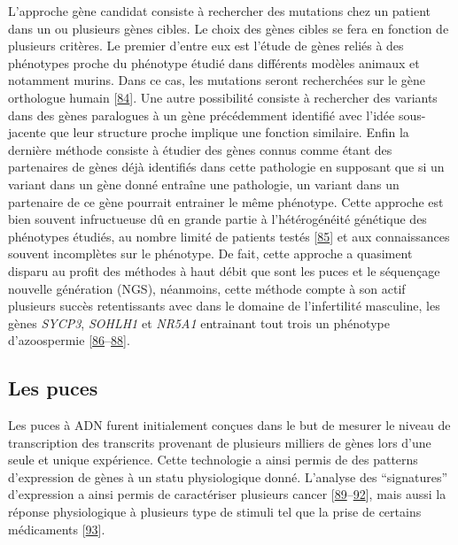 \documentclass[12pt,twoside]{reedthesis}
\theoremstyle{definition}
\theoremstyle{definition}
\theoremstyle{remark}
\begin{document}
  L'approche gène candidat consiste à rechercher des mutations chez un
  patient dans un ou plusieurs gènes cibles. Le choix des gènes cibles se
  fera en fonction de plusieurs critères. Le premier d'entre eux est
  l'étude de gènes reliés à des phénotypes proche du phénotype étudié dans
  différents modèles animaux et notamment murins. Dans ce cas, les
  mutations seront recherchées sur le gène orthologue humain
  {[}\protect\hyperlink{ref-DeBoer2015}{84}{]}. Une autre possibilité
  consiste à rechercher des variants dans des gènes paralogues à un gène
  précédemment identifié avec l'idée sous-jacente que leur structure
  proche implique une fonction similaire. Enfin la dernière méthode
  consiste à étudier des gènes connus comme étant des partenaires de gènes
  déjà identifiés dans cette pathologie en supposant que si un variant
  dans un gène donné entraîne une pathologie, un variant dans un
  partenaire de ce gène pourrait entrainer le même phénotype. Cette
  approche est bien souvent infructueuse dû en grande partie à
  l'hétérogénéité génétique des phénotypes étudiés, au nombre limité de
  patients testés {[}\protect\hyperlink{ref-ElInati2012}{85}{]} et aux
  connaissances souvent incomplètes sur le phénotype. De fait, cette
  approche a quasiment disparu au profit des méthodes à haut débit que
  sont les puces et le séquençage nouvelle génération (NGS), néanmoins,
  cette méthode compte à son actif plusieurs succès retentissants avec
  dans le domaine de l'infertilité masculine, les gènes \emph{SYCP3},
  \emph{SOHLH1} et \emph{NR5A1} entrainant tout trois un phénotype
  d'azoospermie
  {[}\protect\hyperlink{ref-Miyamoto2003}{86}--\protect\hyperlink{ref-Bashamboo2010}{88}{]}.
  
  \newpage
  
  \subsection{Les puces}\label{les-puces}
  
  Les puces à ADN furent initialement conçues dans le but de mesurer le
  niveau de transcription des transcrits provenant de plusieurs milliers
  de gènes lors d'une seule et unique expérience. Cette technologie a
  ainsi permis de des patterns d'expression de gènes à un statu
  physiologique donné. L'analyse des ``signatures'' d'expression a ainsi
  permis de caractériser plusieurs cancer
  {[}\protect\hyperlink{ref-Alon1999}{89}--\protect\hyperlink{ref-VantVeer2002}{92}{]},
  mais aussi la réponse physiologique à plusieurs type de stimuli tel que
  la prise de certains médicaments
  {[}\protect\hyperlink{ref-Brachat2002}{93}{]}.
  
\end{document}
